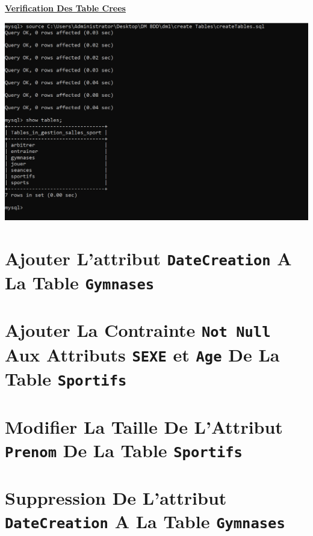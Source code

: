 \newpage

\textbf{\underline{Verification Des Table Crees}}
\vspace{1cm}
\begin{center}
    \includegraphics[height=0.6\textheight]{Parties/Partie1/CreateTables/showTables.PNG}
\end{center}

\newpage
\section{Ajouter L'attribut \texttt{DateCreation} A La Table \texttt{Gymnases}}


\vspace{1cm}
\section{Ajouter La Contrainte \texttt{Not Null} Aux Attributs \texttt{SEXE} et \texttt{Age} De La Table \texttt{Sportifs}}


\vspace{1cm}
\section{Modifier La Taille De L'Attribut \texttt{Prenom} De La Table \texttt{Sportifs}}


\vspace{1cm}
\section{Suppression De L'attribut \texttt{DateCreation} A La Table \texttt{Gymnases}}


